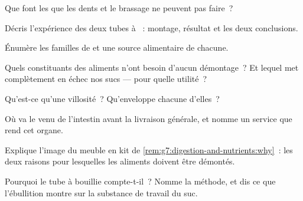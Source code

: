 \begin{exercise}[$\star$]\label{exo:g7:digestion-and-nutrients:1}
Que font les  que les dents et le brassage ne peuvent
pas faire~?
\end{exercise}

\begin{exercise}[$\star$]\label{exo:g7:digestion-and-nutrients:2}
Décris l'expérience des deux tubes à ~: montage, résultat et
les deux conclusions.
\end{exercise}

\begin{exercise}[$\star$]\label{exo:g7:digestion-and-nutrients:3}
Énumère les familles de  et une source alimentaire de
chacune.
\end{exercise}

\begin{exercise}[$\star$]\label{exo:g7:digestion-and-nutrients:4}
Quels constituants des aliments n'ont besoin d'aucun démontage~? Et
lequel met complètement en échec nos sucs --- pour quelle utilité~?
\end{exercise}

\begin{exercise}[$\star$]\label{exo:g7:digestion-and-nutrients:5}
Qu'est-ce qu'une villosité~? Qu'enveloppe chacune d'elles~?
\end{exercise}

\begin{exercise}[$\star$]\label{exo:g7:digestion-and-nutrients:6}
Où va le  venu de l'intestin avant la livraison générale, et
nomme un service que rend cet organe.
\end{exercise}

\begin{exercise}[$\star\star$]\label{exo:g7:digestion-and-nutrients:7}
Explique l'image du meuble en kit de
\cref{rem:g7:digestion-and-nutrients:why}~: les deux raisons pour
lesquelles les aliments doivent être démontés.
\end{exercise}

\begin{exercise}[$\star\star$]\label{exo:g7:digestion-and-nutrients:8}
Pourquoi le tube à  bouillie compte-t-il~? Nomme la méthode,
et dis ce que l'ébullition montre sur la substance de travail du
suc.
\end{exercise}

